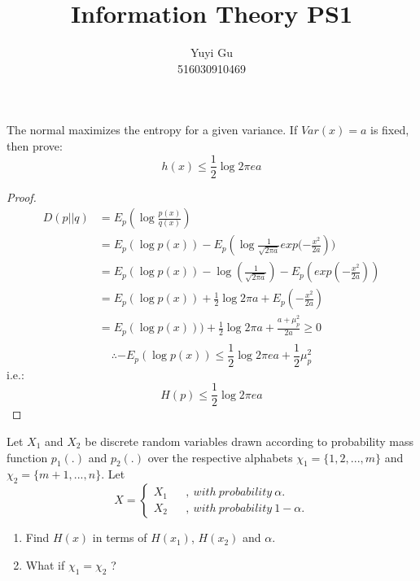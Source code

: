 \documentclass[12pt]{article}
\newenvironment{problem}[2][Problem]{\begin{trivlist}
\item[\hskip \labelsep {\bfseries #1}\hskip \labelsep {\bfseries #2.}]}{\end{trivlist}}
\begin{document}
 
 
\title{Information Theory PS1}%
\author{Yuyi Gu\\ %
516030910469} %
 
\maketitle
\begin{problem}{1 Maximum entropy}
    \item The normal maximizes the entropy for a given variance. If $Var(x)=a$ is fixed, then prove: $$h(x)\leq \frac{1}{2}\log2\pi ea$$
\end{problem}

\begin{proof}{}
    \item
    \begin{align*}
        D(p||q) &= E_p(\log\frac{p(x)}{q(x)}) \\
                &= E_p(\log p(x))-E_p(\log{\frac{1}{\sqrt{2\pi a}} exp(-\frac{x^2}{2a}})) \\
                &= E_p(\log p(x))-\log (\frac{1}{\sqrt{2\pi a}})-E_p(exp(-\frac{x^2}{2a})) \\
                &= E_p(\log p(x))+\frac{1}{2}\log2\pi a +E_p(-\frac{x^2}{2a}) \\
                &= E_p(\log p(x)))+\frac{1}{2}\log2\pi a+\frac{a+\mu_p^2}{2a}\geq0 \\
    \end{align*}
    $$
    \therefore
        -E_p(\log p(x))\leq \frac{1}{2}\log2\pi ea+\frac{1}{2}\mu_p^2
    $$
    i.e.:
    $$
        H(p)\leq \frac{1}{2}\log2\pi ea
    $$

\end{proof}

\begin{problem}{2 Entropy of a disjoint mixture}
    \item Let $X_{1}$ and $X_{2}$ be discrete random variables drawn according to probability mass function $p_{1}(.)$ and $p_{2}(.)$ over the respective alphabets $\chi_{1}=\{1,2,...,m\}$ and $\chi_{2}=\{m+1,...,n\}$. Let
    $$X=\left\{
    \begin{array}{rcl}
    X_1 & & {, \  with \ probability \  \alpha.} \\
    X_2 & & {, \ with \ probability \  1-\alpha.} 
    \end{array}
    \right.
    $$
    \begin{enumerate}[label=(\arabic*)]
    \item Find $H(x)$ in terms of $H\left(x_1\right)$, $H\left(x_2\right)$ and $\alpha$.
    \item What if $\chi_{1}= \chi_{2}$ ?
    \end{enumerate}
\end{problem}
\end{document}
